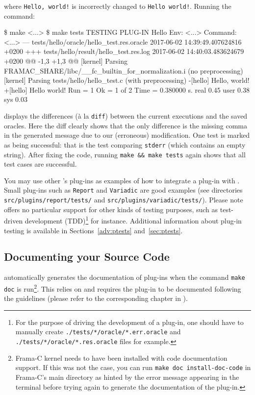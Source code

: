 where \texttt{Hello, world!} is incorrectly changed to \texttt{Hello world!}.
Running the command:
\begin{shell}[breaklines=true]
\$ make
<...>
\$ make tests
TESTING PLUG-IN Hello
Env:
<...>
Command:
<...>
--- tests/hello/oracle/hello_test.res.oracle    2017-06-02 14:39:49.407624816 +0200
+++ tests/hello/result/hello_test.res.log       2017-06-02 14:40:03.483624679 +0200
@@ -1,3 +1,3 @@
 [kernel] Parsing FRAMAC_SHARE/libc/__fc_builtin_for_normalization.i (no preprocessing)
 [kernel] Parsing tests/hello/hello_test.c (with preprocessing)
-[hello] Hello, world!
+[hello] Hello world!
Run = 1
Ok   = 1 of 2
Time = 0.380000 s.
real 0.45
user 0.38
sys 0.03
\end{shell}
displays the differences (à la \texttt{diff}) between the current executions
and the saved oracles. Here the diff clearly shows that the only difference is
the missing comma in the generated message due to our (erroneous) modification.
One test is marked as being successful: that is the test comparing
\texttt{stderr} (which contains an empty string). After fixing the \ocaml code,
running \texttt{make \&\& make tests} again shows that all test cases are
successful.

You may use other \framac's plug-ins as examples of how to integrate a
plug-in with \ptests. Small plug-ins such as \texttt{Report} and
\texttt{Variadic} are good examples (see directories
\texttt{src/plugins/report/tests/} and \texttt{src/plugins/variadic/tests/}).
Please note \framac offers no particular support for other kinds of testing
purposes, such as test-driven development (TDD)\footnote{For the purpose of
driving the development of a plug-in, one should have to manually create
\texttt{./tests/*/oracle/*.err.oracle} and
\texttt{./tests/*/oracle/*.res.oracle} files for example.} for instance.
Additional information about plug-in testing is available in
Sections~\ref{adv:ptests} and~\ref{sec:ptests}.

\subsection{Documenting your Source Code}
\label{tut2:doc}

\framac automatically generates the documentation of plug-ins when the command
\texttt{make doc} is run\footnote{Frama-C kernel needs to have been
installed with code documentation support. If this was not the case, you can
run \texttt{make doc install-doc-code} in Frama-C's main directory as hinted
by the error message appearing in the terminal before trying again to generate
the documentation of the plug-in.}. This relies on \ocamldoc and
requires the plug-in to be documented following the \ocamldoc guidelines
(please refer to the corresponding chapter in \cite{caml}).

